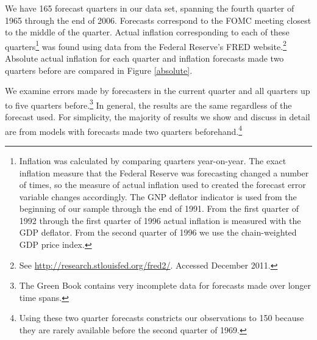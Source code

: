 \documentclass[a4paper]{article}
\begin{document}
We have 165 forecast quarters in our data set, spanning the fourth quarter of 1965 through the end of 2006. Forecasts correspond to the FOMC meeting closest to the middle of the quarter. Actual inflation corresponding to each of these quarters\footnote{Inflation was calculated by comparing quarters year-on-year. The exact inflation measure that the Federal Reserve was forecasting changed a number of times, so the measure of actual inflation used to created the forecast error variable changes accordingly. The GNP deflator indicator is used from the beginning of our sample through the end of 1991. From the first quarter of 1992 through the first quarter of 1996 actual inflation is measured with the GDP deflator.  From the second quarter of 1996 we use the chain-weighted GDP price index.} was found using data from the Federal Reserve's FRED website.\footnote{See \url{http://research.stlouisfed.org/fred2/}. Accessed December 2011.} Absolute actual inflation for each quarter and inflation forecasts made two quarters before are compared in Figure \ref{absolute}. 

We examine errors made by forecasters in the current quarter and all quarters up to five quarters before.\footnote{The Green Book contains very incomplete data for forecasts made over longer time spans.} In general, the results are the same regardless of the forecast used. For simplicity, the majority of results we show and discuss in detail are from models with forecasts made two quarters beforehand.\footnote{Using these two quarter forecasts constricts our observations to 150 because they are rarely available before the second quarter of 1969.}
\end{document}
